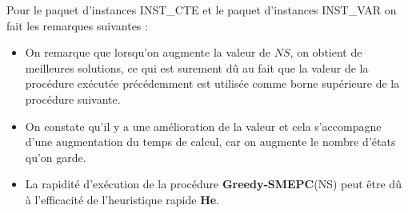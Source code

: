 Pour le paquet d'instances INST\_CTE et le paquet d'instances INST\_VAR on fait les remarques suivantes : 
\begin{itemize}[label=$\square$]
\item On remarque que lorsqu'on augmente la valeur de $NS$, on obtient de meilleures solutions, ce qui est surement dû au fait que la valeur de la procédure exécutée précédemment est utilisée comme borne supérieure de la procédure suivante. 
\item On constate qu'il y a une amélioration de la valeur et cela s'accompagne d'une augmentation du temps de calcul, car on augmente le nombre d'états qu'on garde.	

\item La rapidité d'exécution de la procédure \textbf{Greedy-SMEPC}(NS) peut être dû à l'efficacité de l'heuristique rapide \textbf{He}. 										
\end{itemize}
